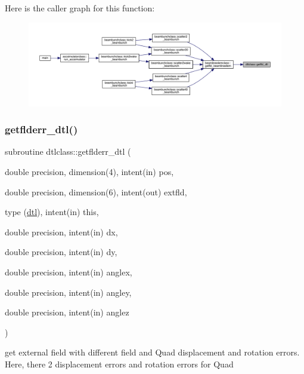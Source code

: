 Here is the caller graph for this function\+:\nopagebreak
\begin{figure}[H]
\begin{center}
\leavevmode
\includegraphics[width=350pt]{namespacedtlclass_a9e97d93c8f7ec49afee134e3ffd3f900_icgraph}
\end{center}
\end{figure}
\mbox{\label{namespacedtlclass_ab866f108c00b307f9e7a55731eadafa4}} 
\subsubsection{\texorpdfstring{getflderr\_dtl()}{getflderr\_dtl()}}
{\footnotesize\ttfamily subroutine dtlclass\+::getflderr\+\_\+dtl (\begin{DoxyParamCaption}\item[{double precision, dimension(4), intent(in)}]{pos,  }\item[{double precision, dimension(6), intent(out)}]{extfld,  }\item[{type (\mbox{\hyperlink{namespacedtlclass_structdtlclass_1_1dtl}{dtl}}), intent(in)}]{this,  }\item[{double precision, intent(in)}]{dx,  }\item[{double precision, intent(in)}]{dy,  }\item[{double precision, intent(in)}]{anglex,  }\item[{double precision, intent(in)}]{angley,  }\item[{double precision, intent(in)}]{anglez }\end{DoxyParamCaption})}



get external field with different field and Quad displacement and rotation errors. Here, there 2 displacement errors and rotation errors for Quad 

